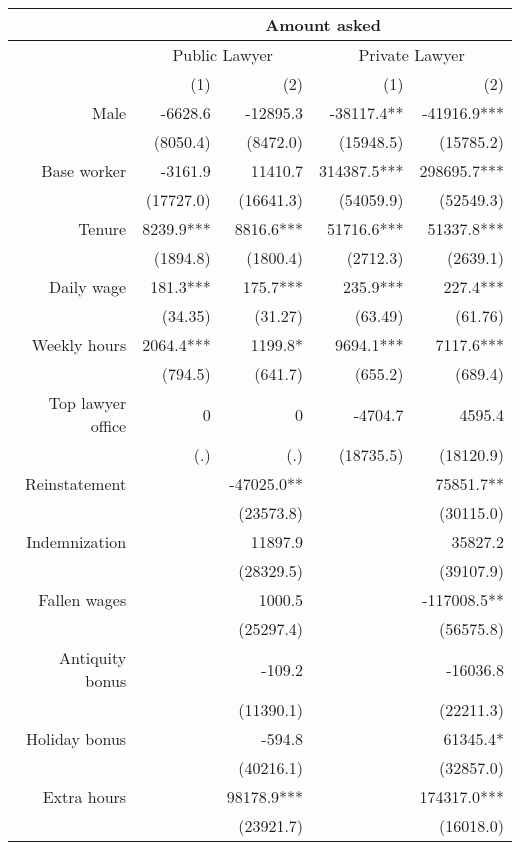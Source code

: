 \begin{tabular}{rrrrr}
\toprule
      & \multicolumn{4}{c}{Amount asked} \\
\midrule
      & \multicolumn{2}{c}{Public Lawyer} & \multicolumn{2}{c}{Private Lawyer} \\
      & (1)   & (2)   & (1)   & (2) \\
Male  & -6628.6 & -12895.3 & -38117.4** & -41916.9*** \\
      & (8050.4) & (8472.0) & (15948.5) & (15785.2) \\
Base worker & -3161.9 & 11410.7 & 314387.5*** & 298695.7*** \\
      & (17727.0) & (16641.3) & (54059.9) & (52549.3) \\
Tenure & 8239.9*** & 8816.6*** & 51716.6*** & 51337.8*** \\
      & (1894.8) & (1800.4) & (2712.3) & (2639.1) \\
Daily wage & 181.3*** & 175.7*** & 235.9*** & 227.4*** \\
      & (34.35) & (31.27) & (63.49) & (61.76) \\
Weekly hours & 2064.4*** & 1199.8* & 9694.1*** & 7117.6*** \\
      & (794.5) & (641.7) & (655.2) & (689.4) \\
Top lawyer office & 0     & 0     & -4704.7 & 4595.4 \\
      & (.)   & (.)   & (18735.5) & (18120.9) \\
Reinstatement &       & -47025.0** &       & 75851.7** \\
      &       & (23573.8) &       & (30115.0) \\
Indemnization &       & 11897.9 &       & 35827.2 \\
      &       & (28329.5) &       & (39107.9) \\
Fallen wages &       & 1000.5 &       & -117008.5** \\
      &       & (25297.4) &       & (56575.8) \\
Antiquity bonus &       & -109.2 &       & -16036.8 \\
      &       & (11390.1) &       & (22211.3) \\
Holiday bonus &       & -594.8 &       & 61345.4* \\
      &       & (40216.1) &       & (32857.0) \\
Extra hours &       & 98178.9*** &       & 174317.0*** \\
      &       & (23921.7) &       & (16018.0) \\

\end{tabular}
